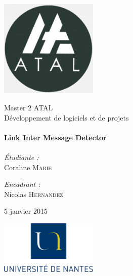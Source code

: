 
\begin{titlepage}
	\begin{center}

		\includegraphics[width=0.35\textwidth]{Figures/ATAL.png}~

		\LARGE{Master 2 \textsc{ATAL}}\\[1.5cm]

		\Large{Développement de logiciels et de projets}\\[0.5cm]

		\HRule \\[0.4cm]
		{ \huge \bfseries Link Inter Message Detector \\[0.4cm] }
		\HRule \\[1.5cm]

		\normalsize		
		\emph{\'Etudiante :}\\
		Coraline \textsc{Marie}

		\vspace{0.5cm}

		\emph{Encadrant :} \\
		Nicolas \textsc{Hernandez}

		\vspace{1cm}

		{\large 5 janvier 2015}

		\vfill

		
		\includegraphics[width=0.35\textwidth]{Figures/logoUN.png}~\\[2cm]

		

	\end{center}
\end{titlepage}
